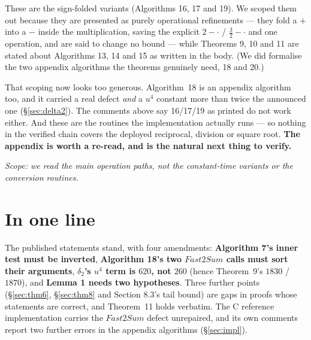 \documentclass[11pt,a4paper]{article}
\newcommand{\alg}[1]{\mathit{#1}}
\begin{document}
\noindent
These are the sign-folded variants (Algorithms 16, 17 and 19). We scoped them
out because they are presented as purely operational refinements --- they fold
a $+$ into a $-$ inside the multiplication, saving the explicit $2 - \cdot$ /
$\frac32 - \cdot$ and one operation, and are said to change no bound --- while
Theorems 9, 10 and 11 are stated about Algorithms 13, 14 and 15 as written in
the body. (We did formalise the two appendix algorithms the theorems genuinely
need, 18 and 20.)

That scoping now looks too generous. Algorithm~18 is an appendix algorithm too,
and it carried a real defect \emph{and} a $u^4$ constant more than twice the
announced one (\S\ref{sec:delta2}). The comments above say 16/17/19 as printed
do not work either. And these are the routines the implementation actually
runs --- so nothing in the verified chain covers the deployed reciprocal,
division or square root. \textbf{The appendix is worth a re-read, and is the
natural next thing to verify.}

\medskip
\noindent\emph{Scope: we read the main operation paths, not the constant-time
variants or the conversion routines.}

\section{In one line}

The published statements stand, with four amendments: \textbf{Algorithm 7's
inner test must be inverted}, \textbf{Algorithm 18's two $\alg{Fast2Sum}$ calls
must sort their arguments}, \textbf{$\delta_2$'s $u^4$ term is $620$, not
$260$} (hence Theorem~9's $1830$ / $1870$), and \textbf{Lemma 1 needs two
hypotheses}. Three further points (\S\ref{sec:thm6}, \S\ref{sec:thm8} and
Section 8.3's tail bound) are gaps in proofs whose statements are correct, and
Theorem~11 holds verbatim. The C reference implementation carries the
$\alg{Fast2Sum}$ defect unrepaired, and its own comments report two further
errors in the appendix algorithms (\S\ref{sec:impl}).
\end{document}
